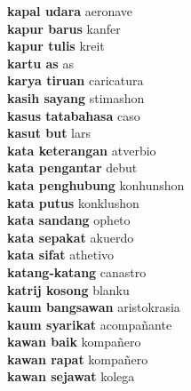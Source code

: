 \textbf{ kapal udara  } aeronave \\
\textbf{ kapur barus  } kanfer \\
\textbf{ kapur tulis  } kreit \\
\textbf{ kartu as  } as \\
\textbf{ karya tiruan  } caricatura \\
\textbf{ kasih sayang  } stimashon \\
\textbf{ kasus tatabahasa  } caso \\
\textbf{ kasut but  } lars \\
\textbf{ kata keterangan  } atverbio \\
\textbf{ kata pengantar  } debut \\
\textbf{ kata penghubung  } konhunshon \\
\textbf{ kata putus  } konklushon \\
\textbf{ kata sandang  } opheto \\
\textbf{ kata sepakat  } akuerdo \\
\textbf{ kata sifat  } athetivo \\
\textbf{ katang-katang  } canastro \\
\textbf{ katrij kosong  } blanku \\
\textbf{ kaum bangsawan  } aristokrasia \\
\textbf{ kaum syarikat  } acompañante \\
\textbf{ kawan baik  } kompañero \\
\textbf{ kawan rapat  } kompañero \\
\textbf{ kawan sejawat  } kolega \\
